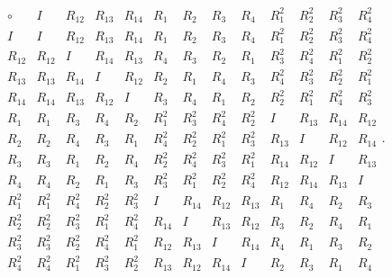 \documentclass[11pt,a4paper]{article}
\begin{document}
\[
\begin{array}{c|c|c|c|c|c|c|c|c|c|c|c|c}
\circ & I & R_{12} & R_{13} & R_{14} & R_1 & R_2 & R_3 & R_4 & R_1^2 & R_2^2 & R_3^2 & R_4^2 \\ \hline
I & I & R_{12} & R_{13} & R_{14} & R_1 & R_2 & R_3 & R_4 & R_1^2 & R_2^2 & R_3^2 & R_4^2\\ \hline
R_{12} & R_{12} & I & R_{14} & R_{13} & R_4 & R_3 & R_2 & R_1 & R_3^2 & R_4^2 & R_1^2 & R_2^2 \\ \hline
R_{13} & R_{13} & R_{14} & I & R_{12} & R_2 & R_1 & R_4 & R_3 & R_4^2 & R_3^2 & R_2^2 & R_1^2 \\ \hline
R_{14} & R_{14} & R_{13} & R_{12} & I & R_3 & R_4 & R_1 & R_2 & R_2^2 & R_1^2 & R_4^2 & R_3^2 \\ \hline
R_1 & R_1 & R_3 & R_4 & R_2 & R_1^2 & R_3^2 & R_4^2 & R_2^2 & I & R_{13} & R_{14} & R_{12} \\ \hline
R_2 & R_2 & R_4 & R_3 & R_1 & R_4^2 & R_2^2 & R_1^2 & R_3^2 & R_{13} & I & R_{12} & R_{14} \\ \hline
R_3 & R_3 & R_1 & R_2 & R_4 & R_2^2 & R_4^2 & R_3^2 & R_1^2 & R_{14} & R_{12} & I & R_{13} \\ \hline
R_4 & R_4 & R_2 & R_1 & R_3 & R_3^2 & R_1^2 & R_2^2 & R_4^2 & R_{12} & R_{14} & R_{13} & I \\ \hline
R_1^2 & R_1^2 & R_4^2 & R_2^2 & R_3^2 & I & R_{14} & R_{12} & R_{13} & R_1 & R_4 & R_2 & R_3 \\ \hline
R_2^2 & R_2^2 & R_3^2 & R_1^2 & R_4^2 & R_{14} & I & R_{13} & R_{12} & R_3 & R_2 & R_4 & R_1 \\ \hline
R_3^2 & R_3^2 & R_2^2 & R_4^2 & R_1^2 & R_{12} & R_{13} & I & R_{14} & R_4 & R_1 & R_3 & R_2 \\ \hline
R_4^2 & R_4^2 & R_1^2 & R_3^2 & R_2^2 & R_{13} & R_{12} & R_{14} & I & R_2 & R_3 & R_1 & R_4
\end{array} 
.\]
\end{document}
